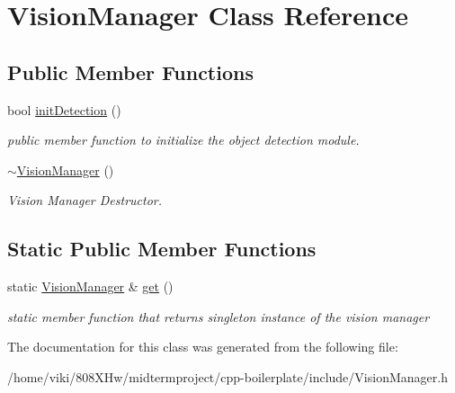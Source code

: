 \hypertarget{class_vision_manager}{}\section{Vision\+Manager Class Reference}
\label{class_vision_manager}
\subsection*{Public Member Functions}
\begin{DoxyCompactItemize}
\item 
bool \hyperlink{class_vision_manager_adcb5352baab5e4ce5a4723c83d855ac7}{init\+Detection} ()\hypertarget{class_vision_manager_adcb5352baab5e4ce5a4723c83d855ac7}{}\label{class_vision_manager_adcb5352baab5e4ce5a4723c83d855ac7}

\begin{DoxyCompactList}\small\item\em public member function to initialize the object detection module. \end{DoxyCompactList}\item 
\hyperlink{class_vision_manager_a19e86478a5507255679aea74f0419e01}{$\sim$\+Vision\+Manager} ()\hypertarget{class_vision_manager_a19e86478a5507255679aea74f0419e01}{}\label{class_vision_manager_a19e86478a5507255679aea74f0419e01}

\begin{DoxyCompactList}\small\item\em Vision Manager Destructor. \end{DoxyCompactList}\end{DoxyCompactItemize}
\subsection*{Static Public Member Functions}
\begin{DoxyCompactItemize}
\item 
static \hyperlink{class_vision_manager}{Vision\+Manager} \& \hyperlink{class_vision_manager_aba19f4e02daa569658b59d63e12d2abe}{get} ()\hypertarget{class_vision_manager_aba19f4e02daa569658b59d63e12d2abe}{}\label{class_vision_manager_aba19f4e02daa569658b59d63e12d2abe}

\begin{DoxyCompactList}\small\item\em static member function that returns singleton instance of the vision manager \end{DoxyCompactList}\end{DoxyCompactItemize}


The documentation for this class was generated from the following file\+:\begin{DoxyCompactItemize}
\item 
/home/viki/808\+X\+Hw/midtermproject/cpp-\/boilerplate/include/Vision\+Manager.\+h\end{DoxyCompactItemize}
